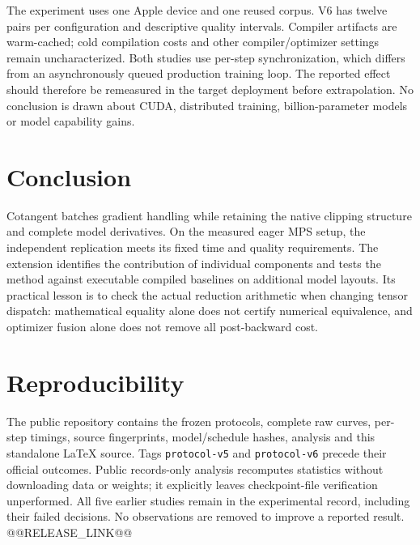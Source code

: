 \documentclass[11pt]{article}
\newcommand{\code}[1]{\texttt{#1}}
\begin{document}
The experiment uses one Apple device and one reused corpus. V6 has twelve
pairs per configuration and descriptive quality intervals. Compiler artifacts
are warm-cached; cold compilation costs and other compiler/optimizer settings
remain uncharacterized. Both studies use per-step synchronization, which differs
from an asynchronously queued production training loop. The reported effect
should therefore be remeasured in the target deployment before extrapolation.
No conclusion is drawn about CUDA, distributed training, billion-parameter
models or model capability gains.

\section{Conclusion}
Cotangent batches gradient handling while retaining the native clipping
structure and complete model derivatives. On the measured eager MPS setup,
the independent replication meets its fixed time and quality requirements.
The extension identifies the contribution of individual components and tests
the method against executable compiled baselines on additional model layouts.
Its practical lesson is to check the actual reduction arithmetic when changing
tensor dispatch: mathematical equality alone does not certify numerical
equivalence, and optimizer fusion alone does not remove all post-backward cost.

\section*{Reproducibility}
The public repository contains the frozen protocols, complete raw curves,
per-step timings, source fingerprints, model/schedule hashes, analysis and this
standalone LaTeX source. Tags \code{protocol-v5} and \code{protocol-v6}
precede their official outcomes. Public records-only analysis recomputes
statistics without downloading data or weights; it explicitly leaves
checkpoint-file verification unperformed. All five earlier studies remain in
the experimental record, including their failed decisions. No observations are
removed to improve a reported result. @@RELEASE_LINK@@
\end{document}
